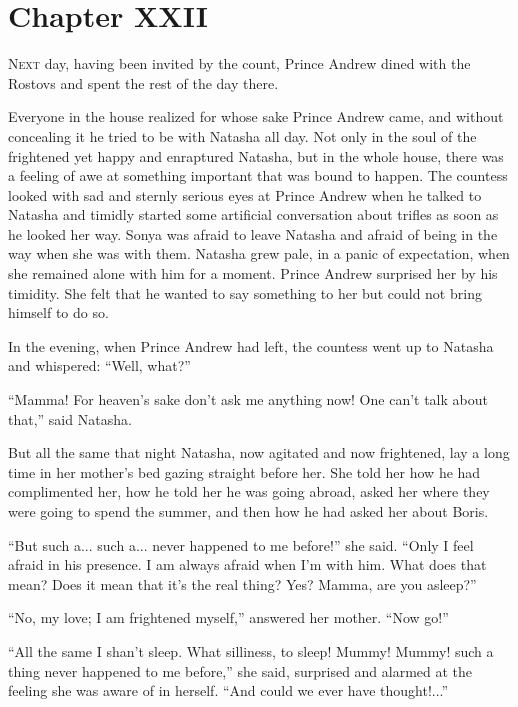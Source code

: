 \chapter*{Chapter XXII}
\ifaudio     
{} 
\fi

\lettrine[lines=2, loversize=0.3, lraise=0]{\initfamily N}{ext}
day, having been invited by the count, Prince Andrew dined
with the Rostovs and spent the rest of the day there.

Everyone in the house realized for whose sake Prince Andrew came,
and without concealing it he tried to be with Natasha all
day. Not only in the soul of the frightened yet happy and
enraptured Natasha, but in the whole house, there was a feeling
of awe at something important that was bound to happen. The
countess looked with sad and sternly serious eyes at Prince
Andrew when he talked to Natasha and timidly started some
artificial conversation about trifles as soon as he looked her
way.  Sonya was afraid to leave Natasha and afraid of being in
the way when she was with them. Natasha grew pale, in a panic of
expectation, when she remained alone with him for a
moment. Prince Andrew surprised her by his timidity. She felt
that he wanted to say something to her but could not bring
himself to do so.

In the evening, when Prince Andrew had left, the countess went up
to Natasha and whispered: ``Well, what?''

``Mamma! For heaven's sake don't ask me anything now! One can't
talk about that,'' said Natasha.

But all the same that night Natasha, now agitated and now
frightened, lay a long time in her mother's bed gazing straight
before her. She told her how he had complimented her, how he told
her he was going abroad, asked her where they were going to spend
the summer, and then how he had asked her about Boris.

``But such a... such a... never happened to me before!'' she
said. ``Only I feel afraid in his presence. I am always afraid
when I'm with him. What does that mean? Does it mean that it's
the real thing? Yes? Mamma, are you asleep?''

``No, my love; I am frightened myself,'' answered her
mother. ``Now go!''

``All the same I shan't sleep. What silliness, to sleep! Mummy!
Mummy!  such a thing never happened to me before,'' she said,
surprised and alarmed at the feeling she was aware of in
herself. ``And could we ever have thought!...''

